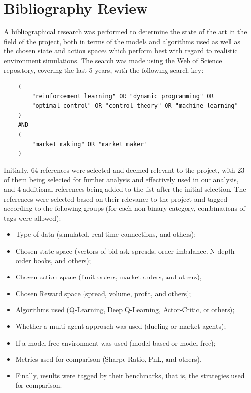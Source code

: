 \section{Bibliography Review}
\label{sec:bibliography-review}

A bibliographical research was performed to determine the state of the art in the field of the project,
both in terms of the models and algorithms used as well as the chosen state and action spaces which perform best
with regard to realistic environment simulations.
The search was made using the Web of Science repository, covering the last 5 years, with the following search key:

\begin{verbatim}
    (
        "reinforcement learning" OR "dynamic programming" OR
        "optimal control" OR "control theory" OR "machine learning"
    )
    AND
    (
        "market making" OR "market maker"
    )
\end{verbatim}

Initially, 64 references were selected and deemed relevant to the project, with 23 of them being selected for further analysis and effectively used in our analysis,
and 4 additional references being added to the list after the initial selection.
The references were selected based on their relevance to the project and tagged according to the following groups
(for each non-binary category, combinations of tags were allowed):

\begin{itemize}
    \item Type of data (simulated, real-time connections, and others);
    \item Chosen state space (vectors of bid-ask spreads, order imbalance, N-depth order books, and others);
    \item Chosen action space (limit orders, market orders, and others);
    \item Chosen Reward space (spread, volume, profit, and others);
    \item Algorithms used (Q-Learning, Deep Q-Learning, Actor-Critic, or others);
    \item Whether a multi-agent approach was used (dueling or market agents);
    \item If a model-free environment was used (model-based or model-free);
    \item Metrics used for comparison (Sharpe Ratio, PnL, and others).
    \item Finally, results were tagged by their benchmarks, that is, the strategies used for comparison.
\end{itemize}

